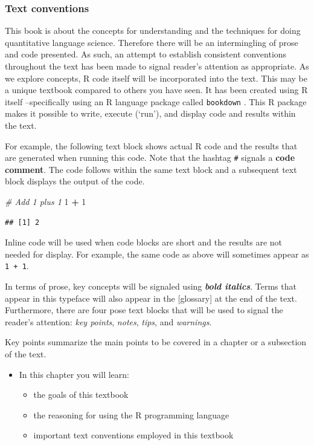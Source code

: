 \documentclass[]{book}
\newenvironment{Shaded}{\begin{snugshade}}{\end{snugshade}}
\newcommand{\CommentTok}[1]{\textcolor[rgb]{0.56,0.35,0.01}{\textit{#1}}}
\newcommand{\DecValTok}[1]{\textcolor[rgb]{0.00,0.00,0.81}{#1}}
\newcommand{\OperatorTok}[1]{\textcolor[rgb]{0.81,0.36,0.00}{\textbf{#1}}}
\newcommand{\StringTok}[1]{\textcolor[rgb]{0.31,0.60,0.02}{#1}}
\providecommand{\tightlist}{%
  \setlength{\itemsep}{0pt}\setlength{\parskip}{0pt}}
\newenvironment{rmdblock}[1]
  {\begin{shaded*}
  \begin{itemize}
  \renewcommand{\labelitemi}{
    \raisebox{-.5\height}[0pt][0pt]{
      {\setkeys{Gin}{width=2em,keepaspectratio}\texttt{[image: images/\#1]}}
    }
  }
  \item
  }
  {
  \end{itemize}
  \end{shaded*}
  }
\newenvironment{rmdkey}
  {\begin{rmdblock}{key}}
  {\end{rmdblock}}
\begin{document}
\hypertarget{textconventions}{%
\subsubsection{Text conventions}\label{textconventions}}

This book is about the concepts for understanding and the techniques for doing quantitative language science. Therefore there will be an intermingling of prose and code presented. As such, an attempt to establish consistent conventions throughout the text has been made to signal reader's attention as appropriate. As we explore concepts, R code itself will be incorporated into the text. This may be a unique textbook compared to others you have seen. It has been created using R itself --specifically using an R language package called \texttt{bookdown} \citep{R-bookdown}. This R package makes it possible to write, execute (`run'), and display code and results within the text.

For example, the following text block shows actual R code and the results that are generated when running this code. Note that the hashtag \texttt{\#} signals a \textbf{code comment}. The code follows within the same text block and a subsequent text block displays the output of the code.

\begin{Shaded}
\begin{Highlighting}[]
\CommentTok{# Add 1 plus 1}
\DecValTok{1} \OperatorTok{+}\StringTok{ }\DecValTok{1}
\end{Highlighting}
\end{Shaded}

\begin{verbatim}
## [1] 2
\end{verbatim}

Inline code will be used when code blocks are short and the results are not needed for display. For example, the same code as above will sometimes appear as \texttt{1\ +\ 1}.

In terms of prose, key concepts will be signaled using \textbf{\emph{bold italics}}. Terms that appear in this typeface will also appear in the {[}glossary{]} at the end of the text. Furthermore, there are four pose text blocks that will be used to signal the reader's attention: \emph{key points}, \emph{notes}, \emph{tips}, and \emph{warnings}.

Key points summarize the main points to be covered in a chapter or a subsection of the text.

\begin{rmdkey}
In this chapter you will learn:

\begin{itemize}
\tightlist
\item
  the goals of this textbook
\item
  the reasoning for using the R programming language
\item
  important text conventions employed in this textbook
\end{itemize}
\end{rmdkey}
\end{document}
